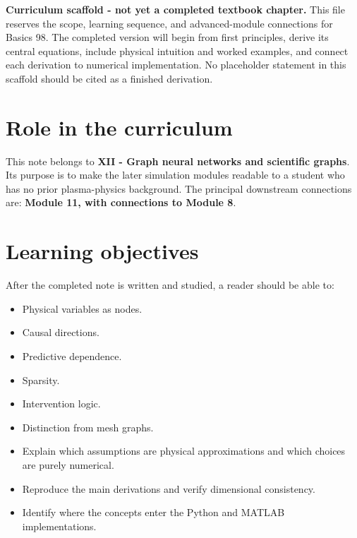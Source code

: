 \documentclass[11pt]{article}
\begin{document}

\begin{overviewbox}
\textbf{Curriculum scaffold - not yet a completed textbook chapter.} This file reserves the scope, learning sequence, and advanced-module connections for Basics 98. The completed version will begin from first principles, derive its central equations, include physical intuition and worked examples, and connect each derivation to numerical implementation. No placeholder statement in this scaffold should be cited as a finished derivation.
\end{overviewbox}

\ProjectTOC

\section{Role in the curriculum}
This note belongs to \textbf{XII - Graph neural networks and scientific graphs}. Its purpose is to make the later simulation modules readable to a student who has no prior plasma-physics background. The principal downstream connections are: \textbf{Module 11, with connections to Module 8}.

\section{Learning objectives}
After the completed note is written and studied, a reader should be able to:
\begin{itemize}[leftmargin=1.6em]
\item Physical variables as nodes.
\item Causal directions.
\item Predictive dependence.
\item Sparsity.
\item Intervention logic.
\item Distinction from mesh graphs.
\item Explain which assumptions are physical approximations and which choices are purely numerical.
\item Reproduce the main derivations and verify dimensional consistency.
\item Identify where the concepts enter the Python and MATLAB implementations.
\end{itemize}
\end{document}
